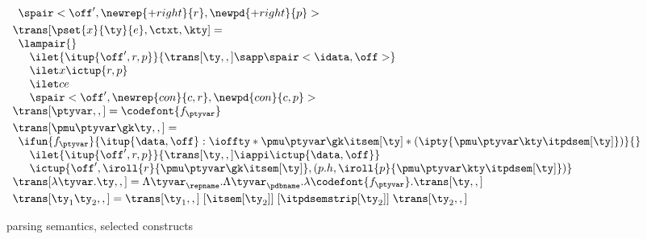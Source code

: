 \begin{figure}
\[\begin{array}{l}
\begin{array}{l}
  {  %
    \def \r {\newrep {+right}{r}}
    \def \p {\newpd {+right}{p}}
    \spair<\off',\r,\p>
  }\\ %
  \end{array}
\\[3pt]
  \trans[\pset{x}{\ty}{e},\ctxt,\kty] = \\
  \begin{array}{l}  
    \lampair{} \\
    \quad \ilet {\itup{\off',r,p}}{\trans[\ty,,] \sapp \spair<\idata,\off>} \\
    \quad \ilet x {\ictup{r,p}}\\
    \quad \ilet c e \\
    \quad \spair<\off',\newrep {con} {c,r},\newpd {con} {c,p}>
  \end{array}
\\[3pt]
\trans[\ptyvar,,] = \codefont{f_\ptyvar}
\\[3pt]
\trans[\pmu \ptyvar \gk \ty,,] = \\
  \begin{array}{l}
  \ifun {f_\ptyvar} {\itup{\data,\off} :
    \ioffty * \pmu \ptyvar \gk \itsem[\ty] 
                    * (\ipty{\pmu \ptyvar \kty \itpdsem[\ty]}) } {}\\
  \quad \ilet {\itup{\off',r,p}} 
   {\trans[\ty,,] \iappi \ictup{\data,\off}} \\ 
  \quad \ictup{\off',\iroll{r}{\pmu \ptyvar \gk \itsem[\ty]},
     (p.h,\iroll{p}{\pmu \ptyvar \kty \itpdsem[\ty]})}
  \end{array}  
\\[3pt]
\trans[\lambda\tyvar . \ty,,] = %
    \Lambda \tyvar_\repname. 
    \Lambda \tyvar_\pdbname. \lambda \codefont{f_\ptyvar}. \trans[\ty,,]
\\[3pt]
\trans[\ty_1 \ty_2,,] = 
    \trans[\ty_1,,]\; [\itsem[\ty_2]]\; [\itpdsemstrip[\ty_2]]\; \trans[\ty_2,,]
\\
\end{array}
\]
\caption{\ddc{} parsing semantics, selected constructs}
\label{fig:ddc-sem-sum}
\end{figure}


